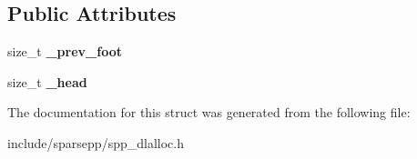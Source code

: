 \subsection*{Public Attributes}
\begin{DoxyCompactItemize}
\item 
size\+\_\+t {\bfseries \+\_\+prev\+\_\+foot}\hypertarget{structspp_1_1malloc__chunk__header_a51eb7f7ee2bb083794711dbdbe248cfe}{}\label{structspp_1_1malloc__chunk__header_a51eb7f7ee2bb083794711dbdbe248cfe}

\item 
size\+\_\+t {\bfseries \+\_\+head}\hypertarget{structspp_1_1malloc__chunk__header_addea7c64d7389824945e157e667d1025}{}\label{structspp_1_1malloc__chunk__header_addea7c64d7389824945e157e667d1025}

\end{DoxyCompactItemize}


The documentation for this struct was generated from the following file\+:\begin{DoxyCompactItemize}
\item 
include/sparsepp/spp\+\_\+dlalloc.\+h\end{DoxyCompactItemize}
